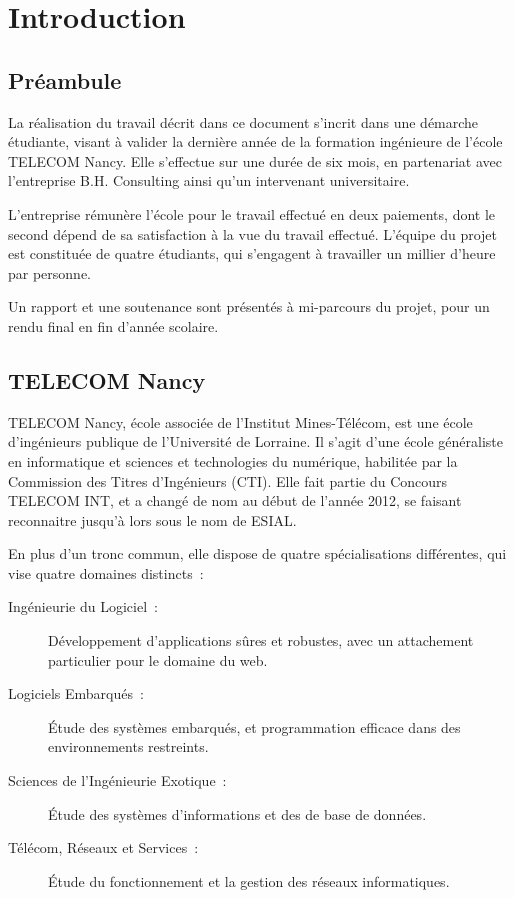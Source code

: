 \newcommand{\titreA}{Rapport de projet}
\newcommand{\titreB}{Projet industriel}


\listoffigures
\newpage

\section{Introduction}
\subsection{Préambule}

La réalisation du travail décrit dans ce document s'incrit dans une démarche étudiante, visant à valider la dernière année de la formation ingénieure de l'école TELECOM Nancy. Elle s'effectue sur une durée de six mois, en partenariat avec l'entreprise B.H. Consulting ainsi qu'un intervenant universitaire.

L'entreprise rémunère l'école pour le travail effectué en deux paiements, dont le second dépend de sa satisfaction à la vue du travail effectué. L'équipe du projet est constituée de quatre étudiants, qui s'engagent à travailler un millier d'heure par personne.

Un rapport et une soutenance sont présentés à mi-parcours du projet, pour un rendu final en fin d'année scolaire.

\subsection{TELECOM Nancy}

TELECOM Nancy, école associée de l'Institut Mines-Télécom, est une école d'ingénieurs publique de l'Université de Lorraine. Il s'agit d'une école généraliste en informatique et sciences et technologies du numérique, habilitée par la Commission des Titres d'Ingénieurs (CTI). Elle fait partie du Concours TELECOM INT, et a changé de nom au début de l'année 2012, se faisant reconnaitre jusqu'à lors sous le nom de ESIAL.

En plus d'un tronc commun, elle dispose de quatre spécialisations différentes, qui vise quatre domaines distincts~:

\begin{description}
\item[Ingénieurie du Logiciel~:] Développement d'applications sûres et robustes, avec un attachement particulier pour le domaine du web.
\item[Logiciels Embarqués~:] Étude des systèmes embarqués, et programmation efficace dans des environnements restreints.
\item[Sciences de l'Ingénieurie Exotique~:] Étude des systèmes d'informations et des de base de données.
\item[Télécom, Réseaux et Services~:] Étude du fonctionnement et la gestion des réseaux informatiques.
\end{description}

